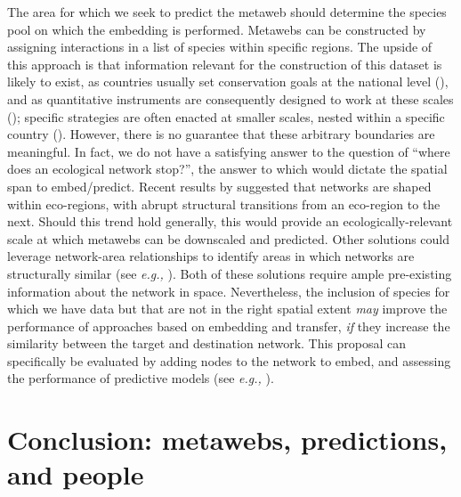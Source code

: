 \begin{refsection}
The area for which we seek to predict the metaweb should determine the
species pool on which the embedding is performed. Metawebs can be
constructed by assigning interactions in a list of species within
specific regions. The upside of this approach is that information
relevant for the construction of this dataset is likely to exist, as
countries usually set conservation goals at the national level
(\cite{Buxton2021Key}), and as quantitative instruments are consequently
designed to work at these scales (\cite{Turak2017Using}); specific
strategies are often enacted at smaller scales, nested within a specific
country (\cite{Ray2021Biodiversity}). However, there is no guarantee that
these arbitrary boundaries are meaningful. In fact, we do not have a
satisfying answer to the question of ``where does an ecological network
stop?'', the answer to which would dictate the spatial span to
embed/predict. Recent results by \cite{Martins2022Global} suggested that
networks are shaped within eco-regions, with abrupt structural
transitions from an eco-region to the next. Should this trend hold
generally, this would provide an ecologically-relevant scale at which
metawebs can be downscaled and predicted. Other solutions could leverage
network-area relationships to identify areas in which networks are
structurally similar (see \emph{e.g.,} \cite{Fortin2021Network,
Galiana2018Spatial, Galiana2022Ecological}). Both of these solutions
require ample pre-existing information about the network in space.
Nevertheless, the inclusion of species for which we have data but that
are not in the right spatial extent \emph{may} improve the performance
of approaches based on embedding and transfer, \emph{if} they increase
the similarity between the target and destination network. This proposal
can specifically be evaluated by adding nodes to the network to embed,
and assessing the performance of predictive models (see \emph{e.g.,}
\cite{Llewelyn2022Predicting}).

\section{Conclusion: metawebs, predictions, and
people}\label{conclusion-metawebs-predictions-and-people}


\end{refsection}
